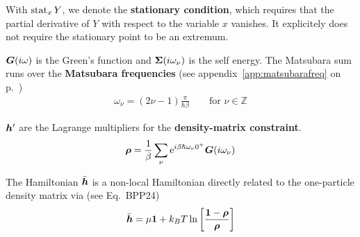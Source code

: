 \documentclass[11pt,a4paper]{report}
\begin{document}
With $\operatorname*{stat}_x Y$, we denote the \textbf{stationary
  condition}, which requires that the
partial derivative of $Y$ with respect to the variable $x$
vanishes. It explicitely does not require the stationary point to be
an extremum.

$\bm{G}(i\omega)$ is the Green's function and
$\bm{\Sigma}(i\omega_\nu)$ is the self energy.  The Matsubara sum
runs over the \textbf{Matsubara frequencies} (see appendix~\ref{app:matsubarafreq} on
p.~\pageref{app:matsubarafreq})
\begin{eqnarray}
\omega_\nu=(2\nu-1)\frac{\pi}{\hbar\beta}
\qquad\text{for $\nu\in\mathbb{Z}$}
\end{eqnarray}

$\bm{h}'$ are the Lagrange multipliers for the \textbf{density-matrix
  constraint}.
\begin{eqnarray}
\bm{\rho}=\frac{1}{\beta}
\sum_\nu\mathrm{e}^{i\beta\hbar\omega_\nu0^+}\bm{G}(i\omega_\nu)
\label{eq:rhoofg}
\end{eqnarray}

The Hamiltonian $\bar{\bm{h}}$ is a non-local Hamiltonian directly
related to the one-particle density matrix via (see Eq.~BPP24)
\begin{eqnarray}
\bar{\bm{h}}=\mu\bm{1}+k_BT\ln
\left[\frac{\bm{1}-\bm{\rho}}{\bm{\rho}}\right]
\label{eq:defhbar}
\end{eqnarray}
\end{document}
